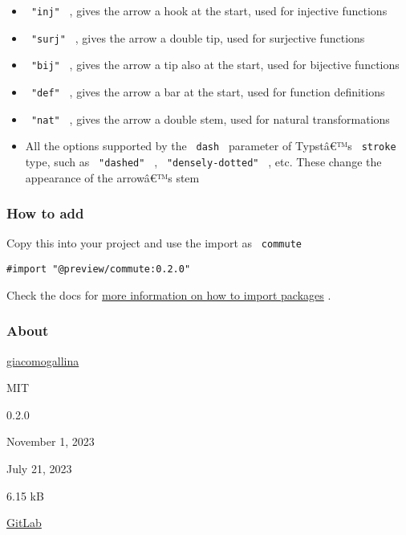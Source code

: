 \begin{itemize}
  \begin{itemize}
  \tightlist
  \item
    \texttt{\ "inj"\ } , gives the arrow a hook at the start, used for
    injective functions
  \item
    \texttt{\ "surj"\ } , gives the arrow a double tip, used for
    surjective functions
  \item
    \texttt{\ "bij"\ } , gives the arrow a tip also at the start, used
    for bijective functions
  \item
    \texttt{\ "def"\ } , gives the arrow a bar at the start, used for
    function definitions
  \item
    \texttt{\ "nat"\ } , gives the arrow a double stem, used for natural
    transformations
  \item
    All the options supported by the \texttt{\ dash\ } parameter of
    Typstâ€™s \texttt{\ stroke\ } type, such as \texttt{\ "dashed"\ } ,
    \texttt{\ "densely-dotted"\ } , etc. These change the appearance of
    the arrowâ€™s stem
  \end{itemize}
\end{itemize}

\subsubsection{How to add}\label{how-to-add}

Copy this into your project and use the import as \texttt{\ commute\ }

\begin{verbatim}
#import "@preview/commute:0.2.0"
\end{verbatim}



Check the docs for
\href{https://typst.app/docs/reference/scripting/\#packages}{more
information on how to import packages} .

\subsubsection{About}\label{about}

\begin{description}
\tightlist
\item[Author :]
\href{https://gitlab.com/giacomogallina}{giacomogallina}
\item[License:]
MIT
\item[Current version:]
0.2.0
\item[Last updated:]
November 1, 2023
\item[First released:]
July 21, 2023
\item[Archive size:]
6.15 kB
\href{https://packages.typst.org/preview/commute-0.2.0.tar.gz}{\pandocbounded{}}
\item[Repository:]
\href{https://gitlab.com/giacomogallina/commute}{GitLab}
\end{description}

